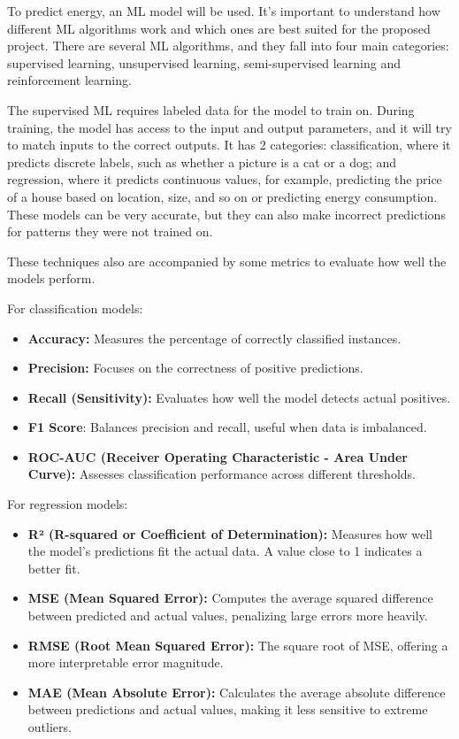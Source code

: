 To predict energy, an ML model will be used. It's important to understand how different ML algorithms work and which ones are best suited for the proposed project. There are several ML algorithms, and they fall into four main categories\cite{sarker2021machine}: supervised learning, unsupervised learning, semi-supervised learning and reinforcement learning.

The supervised ML requires labeled data for the model to train on. During training, the model has access to the input and output parameters, and it will try to match inputs to the correct outputs. It has 2 categories: classification, where it predicts discrete labels, such as whether a picture is a cat or a dog; and regression, where it predicts continuous values, for example, predicting the price of a house based on location, size, and so on or predicting energy consumption. These models can be very accurate, but they can also make incorrect predictions for patterns they were not trained on.{\color{blue} These techniques also are accompanied by some metrics to evaluate how well the models perform.



For classification models:
\begin{itemize}
    \item \textbf{Accuracy:} Measures the percentage of correctly classified instances.
    \item \textbf{Precision:} Focuses on the correctness of positive predictions.
    \item \textbf{Recall (Sensitivity):} Evaluates how well the model detects actual positives.
    \item \textbf{F1 Score}: Balances precision and recall, useful when data is imbalanced.
    \item \textbf{ROC-AUC (Receiver Operating Characteristic - Area Under Curve):} Assesses classification performance across different thresholds.
\end{itemize}

For regression models:
\begin{itemize}
    \item \textbf{R² (R-squared or Coefficient of Determination):} Measures how well the model's predictions fit the actual data. A value close to 1 indicates a better fit.
    \item \textbf{MSE (Mean Squared Error):} Computes the average squared difference between predicted and actual values, penalizing large errors more heavily.
    \item \textbf{RMSE (Root Mean Squared Error):} The square root of MSE, offering a more interpretable error magnitude.
    \item \textbf{MAE (Mean Absolute Error):} Calculates the average absolute difference between predictions and actual values, making it less sensitive to extreme outliers.
\end{itemize}
}

